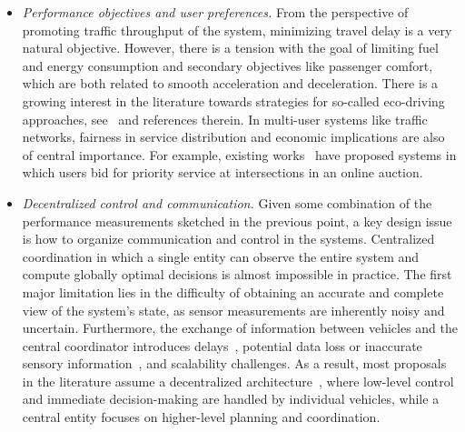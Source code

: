 \documentclass[a4paper]{report}
\theoremstyle{definition}
\theoremstyle{plain}
\begin{document}
\begin{itemize}

  \item \emph{Performance objectives and user preferences.} From the perspective
        of promoting traffic throughput of the system, minimizing travel delay
        is a very natural objective. However, there is a tension with the goal
        of limiting fuel and energy consumption and secondary objectives like
        passenger comfort, which are both related to smooth acceleration and
        deceleration. There is a growing interest in the literature towards
        strategies for so-called eco-driving approaches,
        see~\cite{hadjigeorgiouEnergyConsumptionOptimization2025} and references
        therein.
        In multi-user systems like traffic networks, fairness in service
        distribution and economic implications are also of central importance.
        For example, existing
        works~\cite{reyOnlineIncentiveCompatibleMechanisms2020,sayinInformationDrivenAutonomousIntersection2019}
        have proposed systems in which users bid for priority service at
        intersections in an online auction.
  
  \item \emph{Decentralized control and communication.}
        Given some combination of the performance measurements sketched in the
        previous point, a key design issue is how to organize communication and
        control in the systems.
        Centralized coordination in which a single
        entity can observe the entire system and compute globally optimal
        decisions is almost impossible in practice.
        The first major limitation lies in the difficulty of obtaining an
        accurate and complete view of the system’s state, as sensor measurements
        are inherently noisy and uncertain.
        Furthermore, the exchange of information between vehicles and the
        central coordinator introduces
        delays~\cite{wangAssessingImpactCommunication2024}, potential data loss
        or inaccurate sensory
        information~\cite{vitaleAutonomousIntersectionCrossing2022}, and
        scalability challenges.
        As a result, most proposals in the literature assume a decentralized
        architecture~\cite{yangAutonomousDrivingV2X2022}, where low-level
        control and immediate decision-making are handled by individual
        vehicles, while a central entity focuses on higher-level planning and
        coordination.


\end{itemize}
\end{document}
